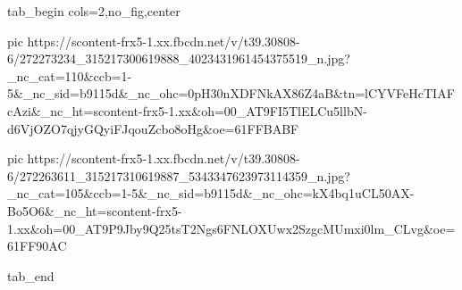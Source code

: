  
 
 
 
 


\ifcmt
  tab_begin cols=2,no_fig,center

     pic https://scontent-frx5-1.xx.fbcdn.net/v/t39.30808-6/272273234_315217300619888_4023431961454375519_n.jpg?_nc_cat=110&ccb=1-5&_nc_sid=b9115d&_nc_ohc=0pH30nXDFNkAX86Z4aB&tn=lCYVFeHcTIAFcAzi&_nc_ht=scontent-frx5-1.xx&oh=00_AT9FI5TlELCu5llbN-d6VjOZO7qjyGQyiFJqouZcbo8oHg&oe=61FFBABF

     pic https://scontent-frx5-1.xx.fbcdn.net/v/t39.30808-6/272263611_315217310619887_5343347623973114359_n.jpg?_nc_cat=105&ccb=1-5&_nc_sid=b9115d&_nc_ohc=kX4bq1uCL50AX-Bo5O6&_nc_ht=scontent-frx5-1.xx&oh=00_AT9P9Jby9Q25tsT2Ngs6FNLOXUwx2SzgcMUmxi0lm_CLvg&oe=61FF90AC

  tab_end
\fi
